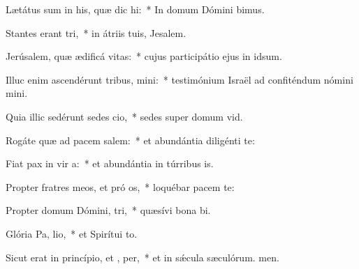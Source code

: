 \item Lætátus sum in his, quæ dic  hi:~* In domum Dómini bimus.
\item Stantes erant  tri,~* in átriis tuis, Jesalem.
\item Jerúsalem, quæ ædificá  vitas:~* cujus participátio ejus in idsum.
\item Illuc enim ascendérunt tribus,  mini:~* testimónium Israël ad confiténdum nómini mini.
\item Quia illic sedérunt sedes  cio,~* sedes super domum vid.
\item Rogáte quæ ad pacem  salem:~* et abundántia diligénti te:
\item Fiat pax in vir a:~* et abundántia in túrribus is.
\item Propter fratres meos, et pró os,~* loquébar pacem  te:
\item Propter domum Dómini,  tri,~* quæsívi bona bi.
\item Glória Pa,  lio,~* et Spirítui to.
\item Sicut erat in princípio, et ,  per,~* et in sǽcula sæculórum. men.
